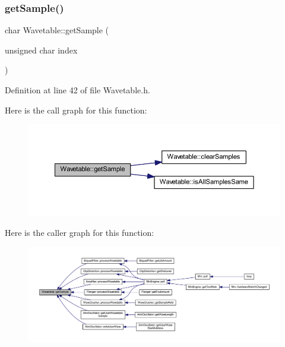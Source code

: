 \subsubsection{\texorpdfstring{get\+Sample()}{getSample()}}
{\footnotesize\ttfamily char Wavetable\+::get\+Sample (\begin{DoxyParamCaption}\item[{unsigned char}]{index }\end{DoxyParamCaption})\hspace{0.3cm}{\ttfamily [inline]}}



Definition at line 42 of file Wavetable.\+h.

Here is the call graph for this function\+:
\nopagebreak
\begin{figure}[H]
\begin{center}
\leavevmode
\includegraphics[width=350pt]{class_wavetable_a2ed27fd46eac11bd828c7111fca7bc0b_cgraph}
\end{center}
\end{figure}
Here is the caller graph for this function\+:
\nopagebreak
\begin{figure}[H]
\begin{center}
\leavevmode
\includegraphics[width=350pt]{class_wavetable_a2ed27fd46eac11bd828c7111fca7bc0b_icgraph}
\end{center}
\end{figure}
\mbox{\label{class_wavetable_ac7f597021cdace95c4e1e4c88fc36d2a}} 
